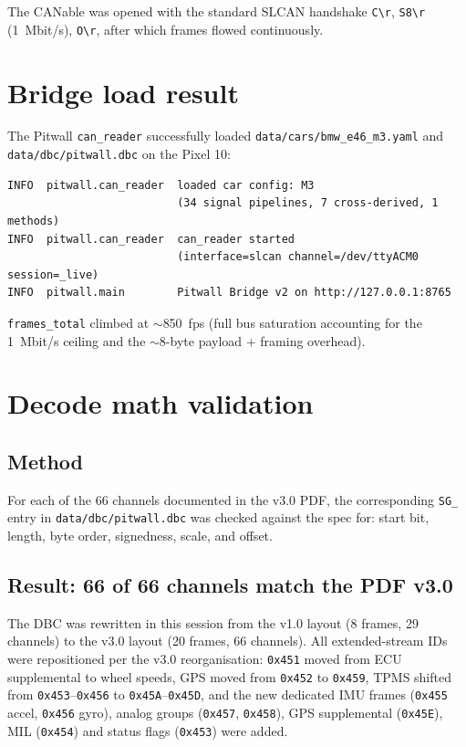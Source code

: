 \documentclass[11pt,a4paper]{article}
\newcommand{\hex}[1]{\texttt{0x#1}}
\begin{document}
The CANable was opened with the standard SLCAN handshake
\texttt{C\textbackslash r}, \texttt{S8\textbackslash r} (\SI{1}{Mbit/s}),
\texttt{O\textbackslash r}, after which frames flowed continuously.

\section{Bridge load result}

The Pitwall \texttt{can\_reader} successfully loaded
\texttt{data/cars/bmw\_e46\_m3.yaml} and \texttt{data/dbc/pitwall.dbc}
on the Pixel 10:

\begin{lstlisting}
INFO  pitwall.can_reader  loaded car config: M3
                          (34 signal pipelines, 7 cross-derived, 1 methods)
INFO  pitwall.can_reader  can_reader started
                          (interface=slcan channel=/dev/ttyACM0 session=_live)
INFO  pitwall.main        Pitwall Bridge v2 on http://127.0.0.1:8765
\end{lstlisting}

\texttt{frames\_total} climbed at $\sim$\SI{850}{fps} (full bus
saturation accounting for the \SI{1}{Mbit/s} ceiling and the
$\sim$8-byte payload + framing overhead).

\section{Decode math validation}

\subsection{Method}

For each of the 66 channels documented in the v3.0 PDF, the
corresponding \texttt{SG\_} entry in \texttt{data/dbc/pitwall.dbc} was
checked against the spec for: start bit, length, byte order,
signedness, scale, and offset.

\subsection{Result: 66 of 66 channels match the PDF v3.0}

The DBC was rewritten in this session from the v1.0 layout (8 frames,
29 channels) to the v3.0 layout (20 frames, 66 channels). All
extended-stream IDs were repositioned per the v3.0 reorganisation:
\hex{451} moved from ECU supplemental to wheel speeds, GPS moved
from \hex{452} to \hex{459}, TPMS shifted from \hex{453}--\hex{456} to
\hex{45A}--\hex{45D}, and the new dedicated IMU frames (\hex{455}
accel, \hex{456} gyro), analog groups (\hex{457}, \hex{458}), GPS
supplemental (\hex{45E}), MIL (\hex{454}) and status flags (\hex{453})
were added.
\end{document}

